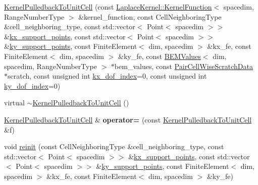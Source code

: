 \begin{DoxyCompactItemize}
\item 
\hyperlink{classLaplaceBEM_1_1KernelPulledbackToUnitCell_afd01d1f6655a678124f2d0e3684b419d}{Kernel\+Pulledback\+To\+Unit\+Cell} (const \hyperlink{classLaplaceBEM_1_1LaplaceKernel_1_1KernelFunction}{Laplace\+Kernel\+::\+Kernel\+Function}$<$ spacedim, Range\+Number\+Type $>$ \&kernel\+\_\+function, const Cell\+Neighboring\+Type \&cell\+\_\+neighboring\+\_\+type, const std\+::vector$<$ Point$<$ spacedim $>$$>$ \&\hyperlink{classLaplaceBEM_1_1KernelPulledbackToUnitCell_ac7667f6cacebaed1a6ba39d67211db04}{kx\+\_\+support\+\_\+points}, const std\+::vector$<$ Point$<$ spacedim $>$$>$ \&\hyperlink{classLaplaceBEM_1_1KernelPulledbackToUnitCell_a92971044a5f8ce2f61688858a3deac8e}{ky\+\_\+support\+\_\+points}, const Finite\+Element$<$ dim, spacedim $>$ \&kx\+\_\+fe, const Finite\+Element$<$ dim, spacedim $>$ \&ky\+\_\+fe, const \hyperlink{classLaplaceBEM_1_1BEMValues}{B\+E\+M\+Values}$<$ dim, spacedim, Range\+Number\+Type $>$ $\ast$bem\+\_\+values, const \hyperlink{structLaplaceBEM_1_1PairCellWiseScratchData}{Pair\+Cell\+Wise\+Scratch\+Data} $\ast$scratch, const unsigned int \hyperlink{classLaplaceBEM_1_1KernelPulledbackToUnitCell_a66ba57ad86025978e5e5580c822aef89}{kx\+\_\+dof\+\_\+index}=0, const unsigned int \hyperlink{classLaplaceBEM_1_1KernelPulledbackToUnitCell_ae6f3e4bc6cf09546bf11d01812f9b692}{ky\+\_\+dof\+\_\+index}=0)
\item 
virtual \hyperlink{classLaplaceBEM_1_1KernelPulledbackToUnitCell_a378e18e1bae6aec940a93dcc03677373}{$\sim$\+Kernel\+Pulledback\+To\+Unit\+Cell} ()
\item 
\mbox{\label{classLaplaceBEM_1_1KernelPulledbackToUnitCell_a1fd71ef63d7bd116cef37b5fe9189c40}} 
\hyperlink{classLaplaceBEM_1_1KernelPulledbackToUnitCell}{Kernel\+Pulledback\+To\+Unit\+Cell} \& {\bfseries operator=} (const \hyperlink{classLaplaceBEM_1_1KernelPulledbackToUnitCell}{Kernel\+Pulledback\+To\+Unit\+Cell} \&f)
\item 
void \hyperlink{classLaplaceBEM_1_1KernelPulledbackToUnitCell_a6c4063a68f9981ed1f2327670c512f59}{reinit} (const Cell\+Neighboring\+Type \&cell\+\_\+neighboring\+\_\+type, const std\+::vector$<$ Point$<$ spacedim $>$$>$ \&\hyperlink{classLaplaceBEM_1_1KernelPulledbackToUnitCell_ac7667f6cacebaed1a6ba39d67211db04}{kx\+\_\+support\+\_\+points}, const std\+::vector$<$ Point$<$ spacedim $>$$>$ \&\hyperlink{classLaplaceBEM_1_1KernelPulledbackToUnitCell_a92971044a5f8ce2f61688858a3deac8e}{ky\+\_\+support\+\_\+points}, const Finite\+Element$<$ dim, spacedim $>$ \&kx\+\_\+fe, const Finite\+Element$<$ dim, spacedim $>$ \&ky\+\_\+fe)

\end{DoxyCompactItemize}
